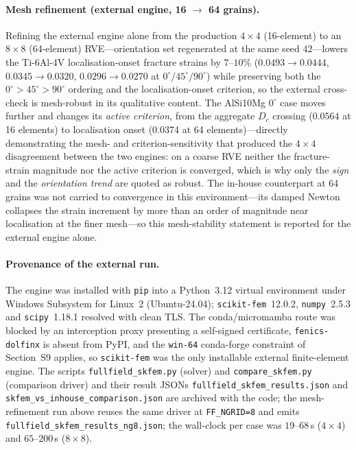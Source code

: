 \documentclass[11pt,a4paper,twocolumn]{article}
\providecommand{\ang}[1]{\ensuremath{#1^{\circ}}}
\begin{document}
\paragraph{Mesh refinement (external engine, 16 $\to$ 64 grains).}
Refining the external engine alone from the production $4\times4$ (16-element) to an $8\times8$ (64-element)
RVE---orientation set regenerated at the same seed $42$---lowers the Ti-6Al-4V localisation-onset fracture
strains by $7$--$10\%$ ($0.0493\to0.0444$, $0.0345\to0.0320$, $0.0296\to0.0270$ at $\ang{0}/\ang{45}/\ang{90}$)
while preserving both the $\ang{0}>\ang{45}>\ang{90}$ ordering and the localisation-onset criterion, so the
external cross-check is mesh-robust in its qualitative content. The AlSi10Mg $\ang{0}$ case moves further and
changes its \emph{active criterion}, from the aggregate $D_c$ crossing ($0.0564$ at 16 elements) to localisation
onset ($0.0374$ at 64 elements)---directly demonstrating the mesh- and criterion-sensitivity that produced the
$4\times4$ disagreement between the two engines: on a coarse RVE neither the fracture-strain magnitude nor the
active criterion is converged, which is why only the \emph{sign} and the \emph{orientation trend} are quoted as
robust. The in-house counterpart at 64 grains was not carried to convergence in this environment---its damped
Newton collapses the strain increment by more than an order of magnitude near localisation at the finer mesh---so
this mesh-stability statement is reported for the external engine alone.

\paragraph{Provenance of the external run.} The engine was installed with \texttt{pip} into a Python~3.12
virtual environment under Windows Subsystem for Linux~2 (Ubuntu-24.04); \texttt{scikit-fem}~12.0.2,
\texttt{numpy}~2.5.3 and \texttt{scipy}~1.18.1 resolved with clean TLS. The conda/micromamba route was blocked
by an interception proxy presenting a self-signed certificate, \texttt{fenics-dolfinx} is absent from PyPI,
and the \texttt{win-64} conda-forge constraint of Section~S9 applies, so \texttt{scikit-fem} was the only
installable external finite-element engine. The scripts \texttt{fullfield\_skfem.py} (solver) and
\texttt{compare\_skfem.py} (comparison driver) and their result JSONs \texttt{fullfield\_skfem\_results.json}
and \texttt{skfem\_vs\_inhouse\_comparison.json} are archived with the code; the mesh-refinement run above reuses
the same driver at \texttt{FF\_NGRID=8} and emits \texttt{fullfield\_skfem\_results\_ng8.json}; the wall-clock per
case was $19$--$68$\,s ($4\times4$) and $65$--$200$\,s ($8\times8$).
\end{document}
